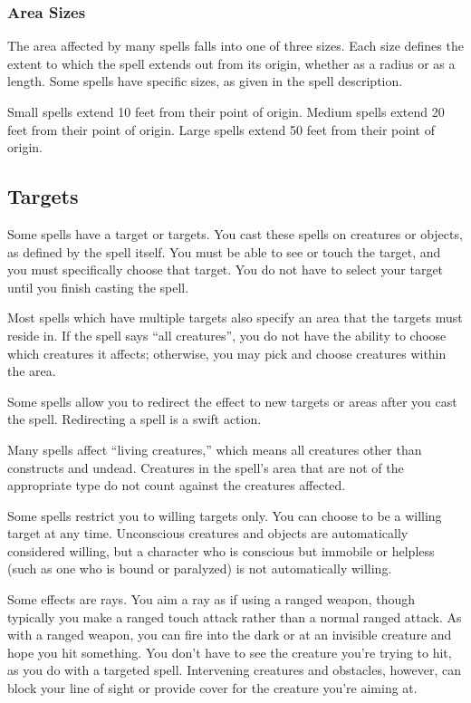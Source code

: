 \subsubsection{Area Sizes}

The area affected by many spells falls into one of three sizes. Each size defines the extent to which the spell extends out from its origin, whether as a radius or as a length. Some spells have specific sizes, as given in the spell description.

 Small spells extend 10 feet from their point of origin.
 Medium spells extend 20 feet from their point of origin.
 Large spells extend 50 feet from their point of origin.

\subsection{Targets}
Some spells have a target or targets. You cast these spells on creatures or objects, as defined by the spell itself. You must be able to see or touch the target, and you must specifically choose that target. You do not have to select your target until you finish casting the spell.

 Most spells which have multiple targets also specify an area that the targets must reside in. If the spell says ``all creatures'', you do not have the ability to choose which creatures it affects; otherwise, you may pick and choose creatures within the area.

 Some spells allow you to redirect the effect to new targets or areas after you cast the spell. Redirecting a spell is a swift action.

 Many spells affect ``living creatures,'' which means all creatures other than constructs and undead. Creatures in the spell's area that are not of the appropriate type do not count against the creatures affected.

 Some spells restrict you to willing targets only. You can choose to be a willing target at any time. Unconscious creatures and objects are automatically considered willing, but a character who is conscious but immobile or helpless (such as one who is bound or paralyzed) is not automatically willing.

 Some effects are rays. You aim a ray as if using a ranged weapon, though typically you make a ranged touch attack rather than a normal ranged attack. As with a ranged weapon, you can fire into the dark or at an invisible creature and hope you hit something. You don't have to see the creature you're trying to hit, as you do with a targeted spell. Intervening creatures and obstacles, however, can block your line of sight or provide cover for the creature you're aiming at.


